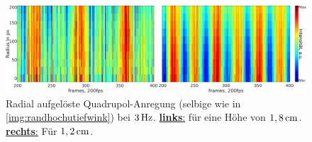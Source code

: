 \documentclass[numbers=noenddot,a4paper,notitlepage,twoside,BCOR15mm]{scrbook}
\newcommand{\fett}[1]{\textbf{#1}}
\begin{document}
				\begin{figure}[!b]
					\centering
					\includegraphics[width=\textwidth,height=0.38\textwidth]{figs/auswertung/plasmaglw/randhochutiefquad3Hz1sekrad.png}
					\caption{Radial aufgelöste Quadrupol-Anregung (selbige wie in \autoref{img:randhochutiefwink}) bei $\unit[3]{Hz}$. \underline{\fett{links}:} für eine Höhe von $\unit[1,8]{cm}$. \underline{\fett{rechts}:} Für $\unit[1,2]{cm}$.}
					\label{img:randhochutiefrad}
				\end{figure}
\end{document}
